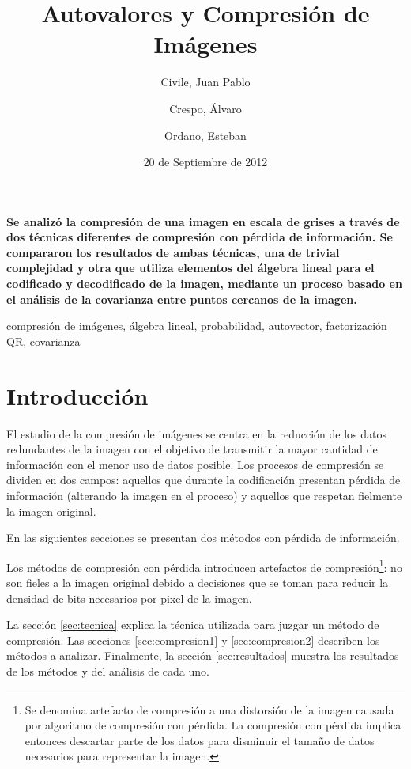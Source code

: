 \documentclass[twocolumn,a4paper,10pt]{article}
\title{Autovalores y Compresión de Imágenes}
\date{20 de Septiembre de 2012}
\author{Civile, Juan Pablo \and Crespo, Álvaro \and Ordano, Esteban }
\begin{document}
\pagestyle{fancy}
\maketitle
\thispagestyle{fancy}

\begin{customabstract}
\textbf{
    Se analizó la compresión de una imagen en escala de grises a través de dos técnicas diferentes de compresión con pérdida de información.
    Se compararon los resultados de ambas técnicas, una de trivial complejidad y otra que utiliza elementos del álgebra lineal para el codificado
    y decodificado de la imagen, mediante un proceso basado en el análisis de la covarianza entre puntos cercanos de la imagen.
}
\end{customabstract}

\begin{keywords}
compresi\'on de im\'agenes, \'algebra lineal, probabilidad, autovector, factorizaci\'on QR, covarianza
\end{keywords}


\section{Introducci\'on}

El estudio de la compresi\'on de im\'agenes se centra en la reducci\'on de los datos redundantes de la imagen con el objetivo de transmitir la mayor cantidad 
de información con el menor uso de datos posible. Los procesos de compresi\'on se dividen en dos campos: aquellos que durante la codificación presentan p\'erdida de 
información (alterando la imagen en el proceso) y aquellos que respetan fielmente la imagen original. 

En las siguientes secciones se presentan dos métodos con pérdida de información. 

Los métodos de compresión con p\'erdida introducen artefactos de compresión\footnote{Se denomina artefacto de compresi\'on a una distorsión de la imagen 
causada por algoritmo de compresi\'on con p\'erdida. La compresi\'on con p\'erdida implica entonces descartar parte de los datos para disminuir el 
tamaño de datos necesarios para representar la imagen.}: no son fieles a la imagen original debido a decisiones que se toman para reducir la densidad 
de bits necesarios por pixel de la imagen.

La secci\'on \ref{sec:tecnica} explica la t\'ecnica utilizada para juzgar un m\'etodo de compresión. Las secciones \ref{sec:compresion1} y \ref{sec:compresion2} 
describen los métodos a analizar. Finalmente, la sección \ref{sec:resultados} muestra los resultados de los métodos y del análisis de cada uno.
\end{document}
